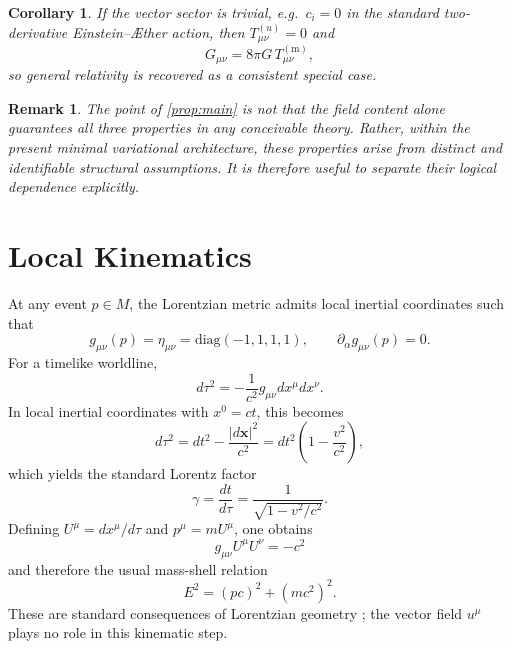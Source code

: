 \documentclass[12pt,a4paper]{article}
\newcommand{\AEther}{\AE{}ther}
\newtheorem{corollary}{Corollary}[proposition]
\newtheorem{remark}{Remark}
\newcommand{\Tmm}{T^{(\mathrm{m})}_{\mu\nu}}
\newcommand{\Tuu}{T^{(u)}_{\mu\nu}}
\begin{document}
            \begin{corollary}
                If the vector sector is trivial, e.g.\ $c_i=0$ in the standard two-derivative
                Einstein--\AEther{} action, then $\Tuu=0$ and
                \begin{equation}
                    G_{\mu\nu}=8\pi G\,\Tmm,
                \end{equation}
                so general relativity is recovered as a consistent special case.
            \end{corollary}
            
            \begin{remark}
                The point of \cref{prop:main} is not that the field content alone guarantees all
                three properties in any conceivable theory. Rather, within the present minimal
                variational architecture, these properties arise from distinct and identifiable
                structural assumptions. It is therefore useful to separate their logical
                dependence explicitly.
            \end{remark}
    
    \section{Local Kinematics}
        \label{sec:kinematics}
        
        At any event $p\in M$, the Lorentzian metric admits local inertial coordinates
        such that
        \begin{equation}
            g_{\mu\nu}(p)=\eta_{\mu\nu}=\mathrm{diag}(-1,1,1,1),
            \qquad
            \partial_\alpha g_{\mu\nu}(p)=0.
        \end{equation}
        For a timelike worldline,
        \begin{equation}
            d\tau^2 = -\frac{1}{c^2} g_{\mu\nu} dx^\mu dx^\nu.
        \end{equation}
        In local inertial coordinates with $x^0=ct$, this becomes
        \begin{equation}
            d\tau^2
            = dt^2 - \frac{|d\mathbf{x}|^2}{c^2}
            = dt^2\left(1-\frac{v^2}{c^2}\right),
        \end{equation}
        which yields the standard Lorentz factor
        \begin{equation}
            \gamma = \frac{dt}{d\tau} = \frac{1}{\sqrt{1-v^2/c^2}}.
        \end{equation}
        Defining $U^\mu=dx^\mu/d\tau$ and $p^\mu=mU^\mu$, one obtains
        \begin{equation}
            g_{\mu\nu}U^\mu U^\nu = -c^2
        \end{equation}
        and therefore the usual mass-shell relation
        \begin{equation}
            E^2 = (pc)^2 + (mc^2)^2.
            \label{eq:massshell}
        \end{equation}
        These are standard consequences of Lorentzian geometry
        \cite{misner1973,carroll2004,will2014}; the vector field $u^\mu$ plays no role
        in this kinematic step.
    
\end{document}
